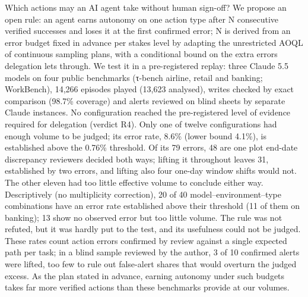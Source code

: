 Which actions may an AI agent take without human sign-off? We propose an open rule: an agent earns autonomy on one action type after N consecutive verified successes and loses it at the first confirmed error; N is derived from an error budget fixed in advance per stakes level by adapting the unrestricted AOQL of continuous sampling plans, with a conditional bound on the extra errors delegation lets through. We test it in a pre-registered replay: three Claude 5.5 models on four public benchmarks (τ-bench airline, retail and banking; WorkBench), 14,266 episodes played (13,623 analysed), writes checked by exact comparison (98.7\% coverage) and alerts reviewed on blind sheets by separate Claude instances. No configuration reached the pre-registered level of evidence required for delegation (verdict R4). Only one of twelve configurations had enough volume to be judged; its error rate, 8.6\% (lower bound 4.1\%), is established above the 0.76\% threshold. Of its 79 errors, 48 are one plot end-date discrepancy reviewers decided both ways; lifting it throughout leaves 31, established by two errors, and lifting also four one-day window shifts would not. The other eleven had too little effective volume to conclude either way. Descriptively (no multiplicity correction), 20 of 40 model--environment--type combinations have an error rate established above their threshold (11 of them on banking); 13 show no observed error but too little volume. The rule was not refuted, but it was hardly put to the test, and its usefulness could not be judged. These rates count action errors confirmed by review against a single expected path per task; in a blind sample reviewed by the author, 3 of 10 confirmed alerts were lifted, too few to rule out false-alert shares that would overturn the judged excess. As the plan stated in advance, earning autonomy under such budgets takes far more verified actions than these benchmarks provide at our volumes.
